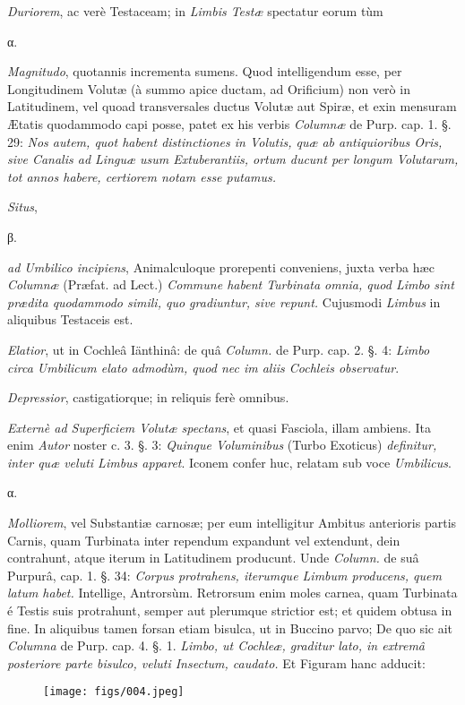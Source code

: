 \documentclass[a4paper, 11pt, oneside, polutonikogreek, german]{article}
\begin{document}
\emph{Duriorem}, ac verè Testaceam; in \emph{Limbis Testæ} spectatur eorum tùm

α.

\emph{Magnitudo}, quotannis incrementa sumens. Quod intelligendum esse, per Longitudinem Volutæ (à summo apice ductam, ad Orificium) non verò in Latitudinem, vel quoad transversales ductus Volutæ aut Spiræ, et exin mensuram Ætatis quodammodo capi posse, patet ex his verbis \emph{Columnæ} de Purp. cap. 1. §. 29: \emph{Nos autem, quot habent distinctiones in Volutis, quæ ab antiquioribus Oris, sive Canalis ad Linguæ usum Extuberantiis, ortum ducunt per longum Volutarum, tot annos habere, certiorem notam esse putamus.}

\emph{Situs},

β.

\emph{ad Umbilico incipiens}, Animalculoque prorepenti conveniens, juxta verba hæc \emph{Columnæ} (Præfat. ad Lect.) \emph{Commune habent Turbinata omnia, quod Limbo sint prædita quodammodo simili, quo gradiuntur, sive repunt.} Cujusmodi \emph{Limbus} in aliquibus Testaceis est.

\emph{Elatior}, ut in Cochleâ Iänthinâ: de quâ \emph{Column.} de Purp. cap. 2. §. 4: \emph{Limbo circa Umbilicum elato admodùm, quod nec im aliis Cochleis observatur}.

\emph{Depressior}, castigatiorque; in reliquis ferè omnibus.

\emph{Externè ad Superficiem Volutæ spectans}, et quasi Fasciola, illam ambiens. Ita enim \emph{Autor} noster c. 3. §. 3: \emph{Quinque Voluminibus} (Turbo Exoticus) \emph{definitur, inter quæ veluti Limbus apparet}. Iconem confer huc, relatam sub voce \emph{Umbilicus}.

α.

\emph{Molliorem}, vel Substantiæ carnosæ; per eum intelligitur Ambitus anterioris partis Carnis, quam Turbinata inter rependum expandunt vel extendunt, dein contrahunt, atque iterum in Latitudinem producunt. Unde \emph{Column.} de suâ Purpurâ, cap. 1. §. 34: \emph{Corpus protrahens, iterumque Limbum producens, quem latum habet.} Intellige, Antrorsùm. Retrorsum enim moles carnea, quam Turbinata é Testis suis protrahunt, semper aut plerumque strictior est; et quidem obtusa in fine. In aliquibus tamen forsan etiam bisulca, ut in Buccino parvo; De quo sic ait \emph{Columna} de Purp. cap. 4. §. 1. \emph{Limbo, ut Cochleæ, graditur lato, in extremâ posteriore parte bisulco, veluti Insectum, caudato.} Et Figuram hanc adducit:

\begin{figure}[H]
\centering
\texttt{[image: figs/004.jpeg]}
\end{figure}
\end{document}
